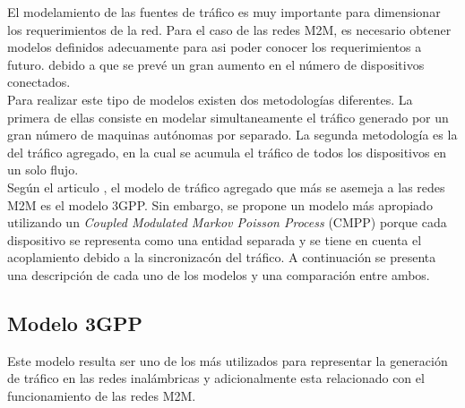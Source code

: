 \documentclass[journal]{IEEEtran}
\begin{document}
El modelamiento de las fuentes de tráfico es muy importante para dimensionar los requerimientos de la red. Para el caso de las redes M2M, es necesario obtener modelos definidos adecuamente para asi poder conocer los requerimientos a futuro. debido a que se prevé un gran aumento en el número de dispositivos conectados.\\

Para realizar este tipo de modelos existen dos metodologías diferentes. La primera de ellas consiste en modelar simultaneamente el tráfico generado por un gran número de maquinas autónomas por separado. La segunda metodología es la del tráfico agregado, en la cual se acumula el tráfico de todos los dispositivos en un solo flujo.\\
 
Según el articulo \cite{art3}, el modelo de tr\'afico agregado que m\'as se asemeja a las redes M2M es el modelo 3GPP. Sin embargo, se propone un modelo m\'as apropiado utilizando un \emph{Coupled Modulated Markov Poisson Process} (CMPP) porque cada dispositivo se representa como una entidad separada y se tiene en cuenta el acoplamiento debido a la sincronizac\'on del tr\'afico. A continuaci\'on se presenta una descripci\'on de cada uno de los modelos y una comparaci\'on entre ambos.
\subsection{Modelo 3GPP}
Este modelo resulta ser uno de los m\'as utilizados para representar la generaci\'on de tr\'afico en las redes inal\'ambricas y adicionalmente esta relacionado con el funcionamiento de las redes M2M.\\
\end{document}
